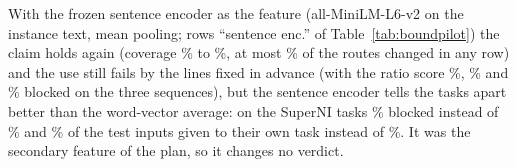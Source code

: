 With the frozen sentence encoder as the feature (all-MiniLM-L6-v2 on the instance text, mean pooling; rows ``sentence enc.'' of Table~\ref{tab:boundpilot}) the claim holds again (coverage \BoundMiniCovLow{}\% to \BoundMiniCovHigh{}\%, at most \BoundMiniChangedMax{}\% of the routes changed in any row) and the use still fails by the lines fixed in advance (with the ratio score \BoundSuperniMiniRatioFiveBlocked{}\%, \BoundLongMiniRatioFiveBlocked{}\% and \BoundBothMiniRatioFiveBlocked{}\% blocked on the three sequences), but the sentence encoder tells the tasks apart better than the word-vector average: on the SuperNI tasks \BoundSuperniMiniRatioFiveBlocked{}\% blocked instead of \BoundSuperniWordRatioFiveBlocked{}\% and \BoundSuperniMiniRatioFiveOwn{}\% of the test inputs given to their own task instead of \BoundSuperniWordRatioFiveOwn{}\%. It was the secondary feature of the plan, so it changes no verdict.
